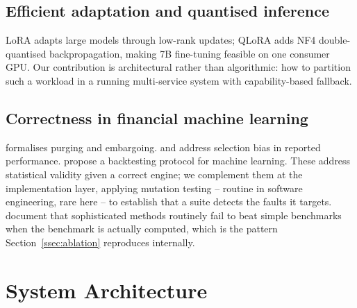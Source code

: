 \documentclass[preprint,12pt,authoryear]{elsarticle}
\begin{document}
\subsection{Efficient adaptation and quantised inference}

LoRA \citep{hu2022lora} adapts large models through low-rank updates; QLoRA
\citep{dettmers2023qlora} adds NF4 double-quantised backpropagation, making 7B
fine-tuning feasible on one consumer GPU. Our contribution is architectural
rather than algorithmic: how to partition such a workload in a running
multi-service system with capability-based fallback.

\subsection{Correctness in financial machine learning}

\citet{lopezdeprado2018advances} formalises purging and embargoing.
\citet{bailey2014deflated} and \citet{harvey2016cross} address selection bias in
reported performance. \citet{arnott2019backtesting} propose a backtesting
protocol for machine learning. These address statistical validity given a
correct engine; we complement them at the implementation layer, applying
mutation testing \citep{jia2011analysis} -- routine in software engineering,
rare here -- to establish that a suite detects the faults it targets.
\citet{makridakis2018statistical} document that sophisticated methods routinely
fail to beat simple benchmarks when the benchmark is actually computed, which is
the pattern Section~\ref{ssec:ablation} reproduces internally.

\section{System Architecture}
\label{sec:arch}
\end{document}
